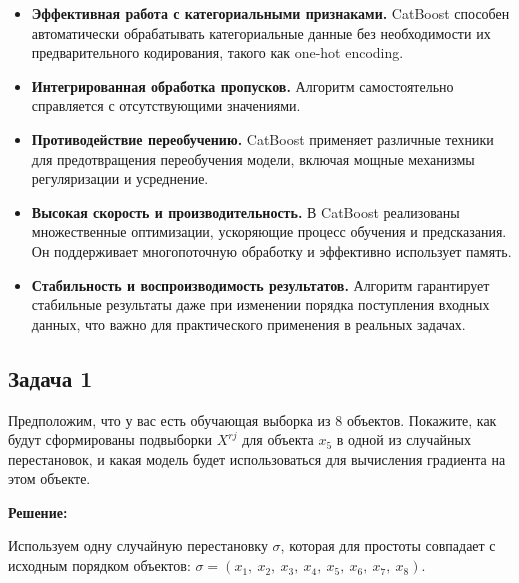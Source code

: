 \begin{itemize}
    \item \textbf{Эффективная работа с категориальными признаками.} CatBoost способен автоматически обрабатывать категориальные данные без необходимости их предварительного кодирования, такого как one-hot encoding.

    \item \textbf{Интегрированная обработка пропусков.} Алгоритм самостоятельно справляется с отсутствующими значениями.
    \item \textbf{Противодействие переобучению.} CatBoost применяет различные техники для предотвращения переобучения модели, включая мощные механизмы регуляризации и усреднение.

    \item \textbf{Высокая скорость и производительность.} В CatBoost реализованы множественные оптимизации, ускоряющие процесс обучения и предсказания. Он поддерживает многопоточную обработку и эффективно использует память.

    \item \textbf{Стабильность и воспроизводимость результатов.} Алгоритм гарантирует стабильные результаты даже при изменении порядка поступления входных данных, что важно для практического применения в реальных задачах.

\end{itemize}

\subsection*{Задача 1}

Предположим, что у вас есть обучающая выборка из 8 объектов. Покажите, как будут сформированы подвыборки $X^{rj} $ для объекта $x_5$ в одной из случайных перестановок, и какая модель будет использоваться для вычисления градиента на этом объекте.

\textbf{Решение:}

Используем одну случайную перестановку $\sigma$, которая для простоты совпадает с исходным порядком объектов: $\sigma = \left( x_1, \ x_2, \ x_3, \ x_4, \ x_5, \ x_6, \ x_7, \ x_8 \right)$.

